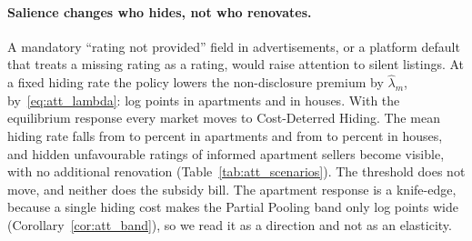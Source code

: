 \paragraph{Salience changes who hides, not who renovates.}
A mandatory ``rating not provided'' field in advertisements, or a platform default that treats a missing rating as a rating, would raise attention to silent listings. At a fixed hiding rate the policy lowers the non-disclosure premium by $\hat\lambda_m$, by~\eqref{eq:att_lambda}: \attSalienceApt{} log points in apartments and \attSalienceHouse{} in houses. With the equilibrium response every market moves to Cost-Deterred Hiding. The mean hiding rate falls from \attSigmaObsApt{} to \attSigmaFullApt{} percent in apartments and from \attSigmaObsHouse{} to \attSigmaFullHouse{} percent in houses, and \attCfRevealedApt{} hidden unfavourable ratings of informed apartment sellers become visible, with no additional renovation (Table~\ref{tab:att_scenarios}). The threshold does not move, and neither does the subsidy bill. The apartment response is a knife-edge, because a single hiding cost makes the Partial Pooling band only \attBandWidthApt{} log points wide (Corollary~\ref{cor:att_band}), so we read it as a direction and not as an elasticity.
